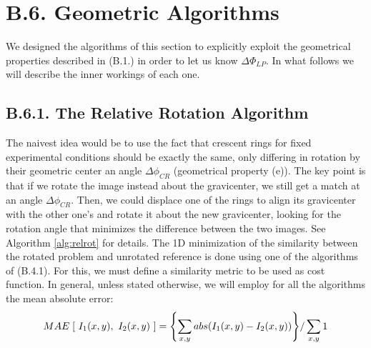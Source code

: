 \documentclass[11pt, a4paper, twoside]{article} %
\begin{document}
\section*{B.6. Geometric Algorithms}
We designed the algorithms of this section to explicitly exploit the geometrical properties described in (B.1.) in order to let us know $\Delta\Phi_{LP}$. In what follows we will describe the inner workings of each one.

\subsection*{B.6.1. The Relative Rotation Algorithm}
The naivest idea would be to use the fact that crescent rings for fixed experimental conditions should be exactly the same, only differing in rotation by their geometric center an angle $\Delta\phi_{CR}$ (geometrical property (e)). The key point is that if we rotate the image instead about the gravicenter, we still get a match at an angle $\Delta\phi_{CR}$. Then, we could displace one of the rings to align its gravicenter with the other one's and rotate it about the new gravicenter, looking for the rotation angle that minimizes the difference between the two images. See Algorithm \ref{alg:relrot} for details. The 1D minimization of the similarity between the rotated problem and unrotated reference is done using one of the algorithms of (B.4.1). For this, we must define a similarity metric to be used as cost function. In general, unless stated otherwise, we will employ for all the algorithms the mean absolute error:
\begin{equation}\label{MAE} MAE\; [\ I_1(x,y),\ I_2(x,y)\ ]=\qty{\sum_{x,y}abs\qty(I_1(x,y)-I_2(x,y))}/\sum_{x,y}1
\end{equation}
\end{document}
